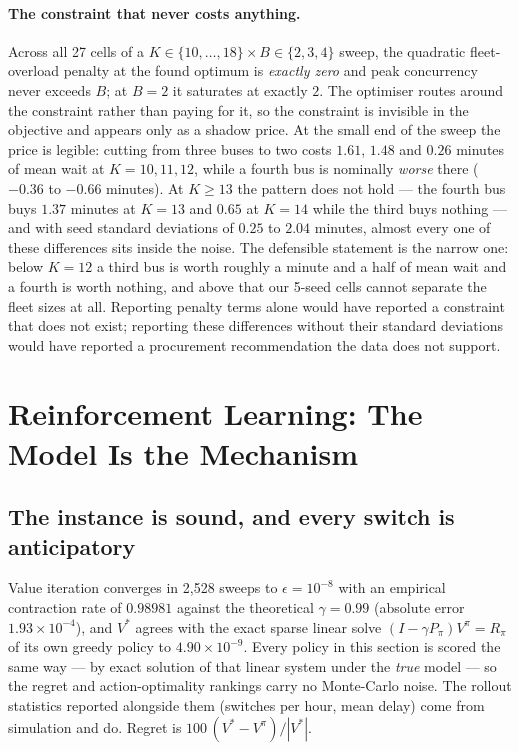 \documentclass[11pt]{article}
\begin{document}
\paragraph{The constraint that never costs anything.} Across all 27 cells of a
$K \in \{10,\dots,18\} \times B \in \{2,3,4\}$ sweep, the quadratic fleet-overload penalty at the
found optimum is \emph{exactly zero} and peak concurrency never exceeds $B$; at $B = 2$ it
saturates at exactly $2$. The optimiser routes around the constraint rather than paying for it, so
the constraint is invisible in the objective and appears only as a shadow price. At the small end of
the sweep the price is legible: cutting from three buses to two costs $1.61$, $1.48$ and $0.26$
minutes of mean wait at $K = 10, 11, 12$, while a fourth bus is nominally \emph{worse} there
($-0.36$ to $-0.66$ minutes). At $K \geq 13$ the pattern does not hold --- the fourth bus buys
$1.37$ minutes at $K = 13$ and $0.65$ at $K = 14$ while the third buys nothing --- and with seed
standard deviations of $0.25$ to $2.04$ minutes, almost every one of these differences sits inside
the noise. The defensible statement is the narrow one: below $K = 12$ a third bus is worth roughly
a minute and a half of mean wait and a fourth is worth nothing, and above that our 5-seed cells
cannot separate the fleet sizes at all. Reporting penalty terms alone would have reported a
constraint that does not exist; reporting these differences without their standard deviations would
have reported a procurement recommendation the data does not support.

\section{Reinforcement Learning: The Model Is the Mechanism}
\label{sec:rl}

\subsection{The instance is sound, and every switch is anticipatory}

Value iteration converges in 2,528 sweeps to $\epsilon = 10^{-8}$ with an empirical contraction
rate of $0.98981$ against the theoretical $\gamma = 0.99$ (absolute error $1.93\times10^{-4}$), and
$V^{*}$ agrees with the exact sparse linear solve $(I - \gamma P_\pi)V^{\pi} = R_\pi$ of its own
greedy policy to $4.90\times10^{-9}$. Every policy in this section is scored the same way --- by
exact solution of that linear system under the \emph{true} model --- so the regret and
action-optimality rankings carry no Monte-Carlo noise. The rollout statistics reported alongside
them (switches per hour, mean delay) come from simulation and do. Regret is $100\,(V^{*} - V^{\pi})/|V^{*}|$.
\end{document}
